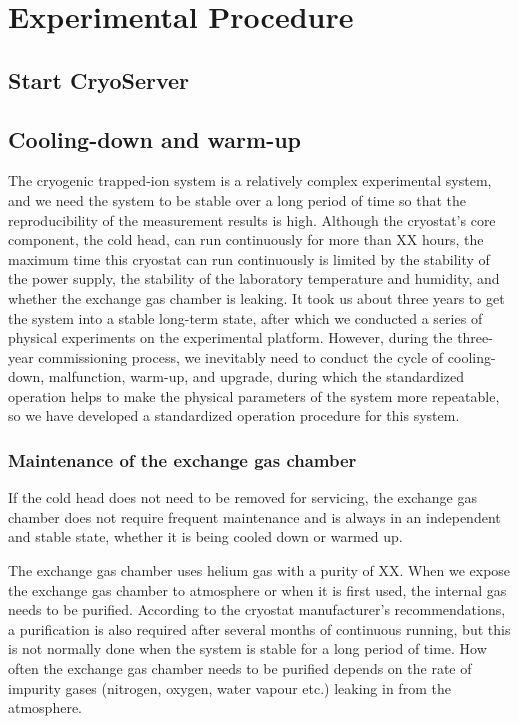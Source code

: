 
\chapter{Experimental Procedure}

\section{Start CryoServer}

\section{Cooling-down and warm-up}

The cryogenic trapped-ion system is a relatively complex experimental system, and we need the system to be stable over a long period of time so that the reproducibility of the measurement results is high. Although the cryostat's core component, the cold head, can run continuously for more than XX hours, the maximum time this cryostat can run continuously is limited by the stability of the power supply, the stability of the laboratory temperature and humidity, and whether the exchange gas chamber is leaking. It took us about three years to get the system into a stable long-term state, after which we conducted a series of physical experiments on the experimental platform. However, during the three-year commissioning process, we inevitably need to conduct the cycle of cooling-down, malfunction, warm-up, and upgrade, during which the standardized operation helps to make the physical parameters of the system more repeatable, so we have developed a standardized operation procedure for this system.

\subsection{Maintenance of the exchange gas chamber}

If the cold head does not need to be removed for servicing, the exchange gas chamber does not require frequent maintenance and is always in an independent and stable state, whether it is being cooled down or warmed up.

The exchange gas chamber uses helium gas with a purity of XX. When we expose the exchange gas chamber to atmosphere or when it is first used, the internal gas needs to be purified. According to the cryostat manufacturer's recommendations, a purification is also required after several months of continuous running, but this is not normally done when the system is stable for a long period of time. How often the exchange gas chamber needs to be purified depends on the rate of impurity gases (nitrogen, oxygen, water vapour etc.) leaking in from the atmosphere.

